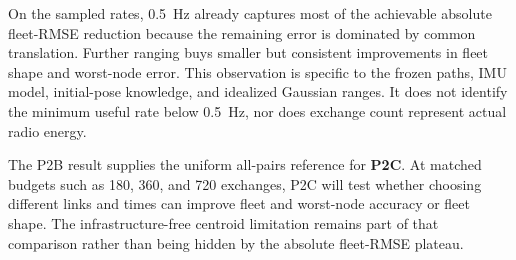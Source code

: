 On the sampled rates, \SI{0.5}{Hz} already captures most of the achievable absolute fleet-RMSE reduction because the remaining error is dominated by common translation. Further ranging buys smaller but consistent improvements in fleet shape and worst-node error. This observation is specific to the frozen paths, IMU model, initial-pose knowledge, and idealized Gaussian ranges. It does not identify the minimum useful rate below \SI{0.5}{Hz}, nor does exchange count represent actual radio energy.

The P2B result supplies the uniform all-pairs reference for \textbf{P2C}. At matched budgets such as 180, 360, and 720 exchanges, P2C will test whether choosing different links and times can improve fleet and worst-node accuracy or fleet shape. The infrastructure-free centroid limitation remains part of that comparison rather than being hidden by the absolute fleet-RMSE plateau.
